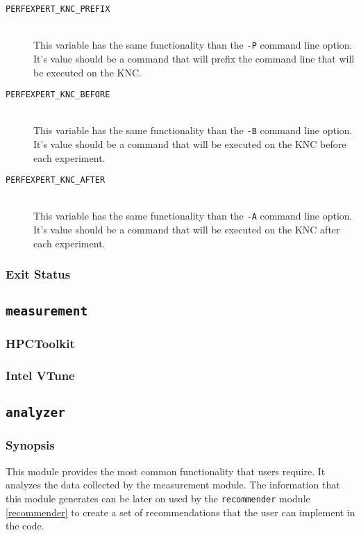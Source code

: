 \begin{description}
	\item[\texttt{PERFEXPERT\_KNC\_PREFIX}]\hfill \\
	This variable has the same functionality than the \texttt{-P} command line option. It's value should be a command that will prefix the command line that will be executed on the KNC.

	\item[\texttt{PERFEXPERT\_KNC\_BEFORE}]\hfill \\
	This variable has the same functionality than the \texttt{-B} command line option. It's value should be a command that will be executed on the KNC before each experiment.

	\item[\texttt{PERFEXPERT\_KNC\_AFTER}]\hfill \\
	This variable has the same functionality than the \texttt{-A} command line option. It's value should be a command that will be executed on the KNC after each experiment.

\end{description}

\subsubsection{Exit Status}

\subsection{\texttt{measurement}}

\subsubsection{HPCToolkit}

\subsubsection{Intel VTune}

\subsection{\texttt{analyzer}}

\subsubsection{Synopsis}

This module provides the most common functionality that users require. It analyzes the data
collected by the measurement module. The information that this module generates can be later
on used by the \texttt{recommender} module \ref{recommender}
to create a set of recommendations that the user can implement in the code.

